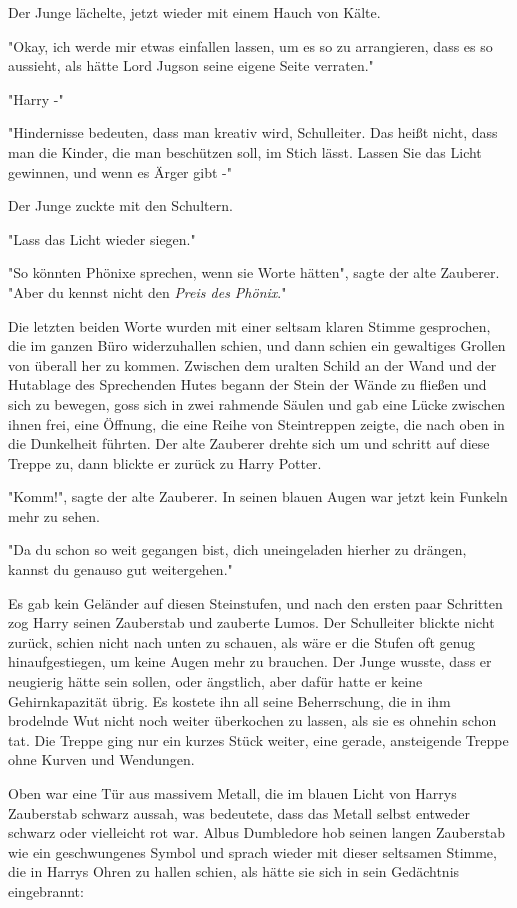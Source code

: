 {Der Junge lächelte, jetzt wieder mit einem Hauch von Kälte.

"Okay, ich werde mir etwas einfallen lassen, um es so zu arrangieren, dass es so aussieht, als hätte Lord Jugson seine eigene Seite verraten."

"Harry -"

"Hindernisse bedeuten, dass man kreativ wird, Schulleiter. Das heißt nicht, dass man die Kinder, die man beschützen soll, im Stich lässt. Lassen Sie das Licht gewinnen, und wenn es Ärger gibt -"

Der Junge zuckte mit den Schultern.

"Lass das Licht wieder siegen."

"So könnten Phönixe sprechen, wenn sie Worte hätten", sagte der alte Zauberer. "Aber du kennst nicht den \emph{Preis des Phönix}."

Die letzten beiden Worte wurden mit einer seltsam klaren Stimme gesprochen, die im ganzen Büro widerzuhallen schien, und dann schien ein gewaltiges Grollen von überall her zu kommen. Zwischen dem uralten Schild an der Wand und der Hutablage des Sprechenden Hutes begann der Stein der Wände zu fließen und sich zu bewegen, goss sich in zwei rahmende Säulen und gab eine Lücke zwischen ihnen frei, eine Öffnung, die eine Reihe von Steintreppen zeigte, die nach oben in die Dunkelheit führten. Der alte Zauberer drehte sich um und schritt auf diese Treppe zu, dann blickte er zurück zu Harry Potter.

"Komm!", sagte der alte Zauberer. In seinen blauen Augen war jetzt kein Funkeln mehr zu sehen.

"Da du schon so weit gegangen bist, dich uneingeladen hierher zu drängen, kannst du genauso gut weitergehen."

Es gab kein Geländer auf diesen Steinstufen, und nach den ersten paar Schritten zog Harry seinen Zauberstab und zauberte Lumos. Der Schulleiter blickte nicht zurück, schien nicht nach unten zu schauen, als wäre er die Stufen oft genug hinaufgestiegen, um keine Augen mehr zu brauchen. Der Junge wusste, dass er neugierig hätte sein sollen, oder ängstlich, aber dafür hatte er keine Gehirnkapazität übrig. Es kostete ihn all seine Beherrschung, die in ihm brodelnde Wut nicht noch weiter überkochen zu lassen, als sie es ohnehin schon tat. Die Treppe ging nur ein kurzes Stück weiter, eine gerade, ansteigende Treppe ohne Kurven und Wendungen.

Oben war eine Tür aus massivem Metall, die im blauen Licht von Harrys Zauberstab schwarz aussah, was bedeutete, dass das Metall selbst entweder schwarz oder vielleicht rot war. Albus Dumbledore hob seinen langen Zauberstab wie ein geschwungenes Symbol und sprach wieder mit dieser seltsamen Stimme, die in Harrys Ohren zu hallen schien, als hätte sie sich in sein Gedächtnis eingebrannt:

}
